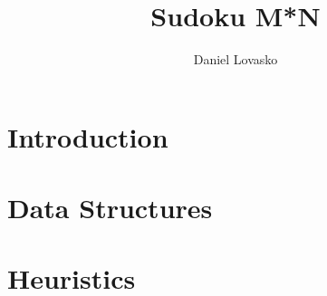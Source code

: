 \documentclass{article}
\begin{document}
	\title{Sudoku M*N}
	\author{Daniel Lovasko}
	\date{}
	\maketitle
	
	\section*{Introduction}
	\pagebreak

	\section{Data Structures}
	\pagebreak

	\section{Heuristics}
	\pagebreak
\end{document}
